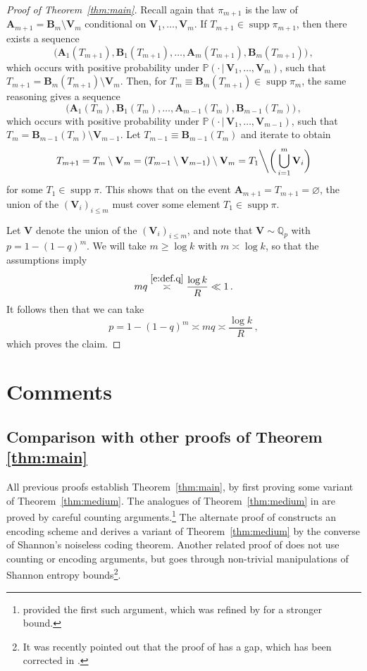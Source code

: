 \documentclass[11pt,reqno]{amsart}
\theoremstyle{plain}
\theoremstyle{definition}
\theoremstyle{remark}
\newcommand{\Q}{\mathbb{Q}}
\newcommand{\PP}{\mathbb{P}}
\DeclareMathOperator{\supp}{supp}
\newcommand{\bA}{\mathbf{A}}
\newcommand{\bV}{\mathbf{V}}
\newcommand{\bB}{\mathbf{B}}
\renewcommand{\emptyset}{\varnothing}
\begin{document}
\begin{proof}[Proof of Theorem~\ref{thm:main}]
Recall again that $\pi_{m+1}$ is the law of $\bA_{m+1}=\bB_m\setminus\bV_m$ conditional on $\bV_1,\ldots,\bV_m$. If $T_{m+1}\in\supp\pi_{m+1}$,  then there exists a sequence
	\[\Big(\bA_1(T_{m+1}),\bB_1(T_{m+1}),\ldots,
	\bA_m(T_{m+1}),\bB_m(T_{m+1})\Big)\,,\]
which occurs with positive probability under $\PP(\cdot\,|\,\bV_1,\ldots,\bV_m)$,  such that $T_{m+1}=\bB_m(T_{m+1})\setminus \bV_m$. Then, for $T_m \equiv \bB_m(T_{m+1})\in\supp\pi_m$,  the same reasoning gives a sequence
	\[\Big(\bA_1(T_m),\bB_1(T_m),\ldots,
	\bA_{m-1}(T_m),\bB_{m-1}(T_m)\Big)\,,\]
which occurs with positive probability under $\PP(\cdot\,|\,\bV_1,\ldots,\bV_{m-1})$,  such that
$T_m = \bB_{m-1}(T_m) \setminus \bV_{m-1}$. Let
$T_{m-1}\equiv \bB_{m-1}(T_m)$ and iterate to obtain
	\[
	T_{m+1}
	= T_m\setminus \bV_m
	= (T_{m-1}\setminus \bV_{m-1}) \setminus \bV_m
	= T_1 \bigg\backslash \bigg( \bigcup_{i=1}^m \bV_i\bigg)
	\]
for some $T_1\in\supp\pi$.  This shows that on the event $\bA_{m+1}=T_{m+1}=\emptyset$, the union of the $(\bV_i)_{i\le m}$ must cover some element $T_1\in\supp\pi$. 


Let $\bV$ denote the union of the $(\bV_i)_{i\le m}$, and note that $\bV\sim\Q_p$ with $p=1-(1-q)^m$. We will take $m\ge \log k$ with
 $m\asymp\log k$, so that the assumptions imply
	\[
	mq \stackrel{\eqref{e:def.q}}{\asymp} \frac{\log k}{R} \ll 1\,.
	\]
It follows then that we can take
	\[
	p=1-(1-q)^m \asymp mq \asymp \frac{\log k}{R}\,,
	\]
which proves the claim.
\end{proof}


\section{Comments}\label{s:comments}

\subsection{Comparison with other proofs of Theorem \ref{thm:main}}


All previous proofs establish Theorem~\ref{thm:main}, by first proving some variant of Theorem~\ref{thm:medium}. The analogues of 
Theorem~\ref{thm:medium} in \cite{sunflower_annals,fracKK_annals}
are proved by careful counting arguments.\footnote{\cite{sunflower_annals} provided the first such argument, which was refined by \cite{fracKK_annals} for a stronger bound.} The alternate proof of \cite{Rao_sunflower} constructs an encoding scheme and derives a variant of Theorem~\ref{thm:medium} by the converse of Shannon’s noiseless coding theorem. Another related proof of \cite{Tao_sunflower} does not use counting or encoding arguments, but goes through non-trivial manipulations of Shannon entropy bounds\footnote{It was recently pointed out that the proof of \cite{Tao_sunflower} has a gap, which has been corrected in \cite{Hu_sunflower, Stoeckl_sunflower}.}. 
\end{document}

